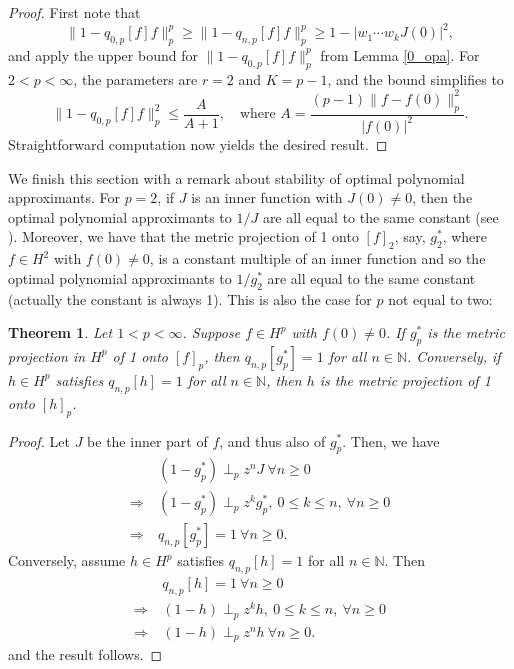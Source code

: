 \documentclass{article}
\theoremstyle{plain}
\newtheorem{Theorem}{Theorem}
\numberwithin{Theorem}{section}
\numberwithin{equation}{section}
\theoremstyle{plain}
\theoremstyle{definition}
\renewcommand{\leq}{\leqslant}
\renewcommand{\geq}{\geqslant}
\begin{document}
\begin{proof}
First note that 
\[
\|1 - q_{0,p}[f]f\|_p^p \geq \|1 - q_{n,p}[f]f\|_p^p \geq 1 - |w_1\cdots w_kJ(0)|^2,
\]
and apply the upper bound for $\|1 - q_{0,p}[f]f\|_p^p$ from Lemma \ref{0_opa}. For $2 < p < \infty$, the parameters are $r = 2$ and $K = p - 1$, and the bound simplifies to
\[
\|1 - q_{0,p}[f]f\|_p^{2} \leq \frac{A}{A + 1}, \quad \text{where } A = \frac{(p - 1)\|f - f(0)\|_p^2}{|f(0)|^2}.
\]
Straightforward computation now yields the desired result. 
\end{proof}
\iffalse
We finish this section with a remark about stability of optimal polynomial approximants. For $p=2$, if $J$ is an inner function with $J(0)\neq0$, then the optimal polynomial approximants to $1/J$ are all equal to the same constant (see \cite{BFKSS}). Moreover, we have that the metric projection of 1 onto $[f]_2$, say, $g_2^*$, where $f\in H^2$ with $f(0)\neq0$, is a constant multiple of an inner function and so the optimal polynomial approximants to $1/g_2^*$ are all equal to the same constant (actually the constant is always 1). This is also the case for $p$ not equal to two:
\begin{Theorem}
    Let $1<p<\infty$. Suppose $f\in H^p$ with $f(0)\neq0$. If $g_p^*$ is the metric projection in $H^p$ of 1 onto $[f]_p$, then $q_{n,p}[g_p^*] = 1$ for all $n\in\mathbb{N}$.  Conversely, if $h \in H^p$ satisfies $q_{n,p}[h] = 1$ for all $n\in\mathbb{N}$, then $h$ is the metric projection of 1 onto $[h]_p$.
\end{Theorem}
\begin{proof}  
Let $J$ be the inner part of $f$, and thus also of $g_p^*$. Then, we have
    \begin{align*}
        & (1-g_p^*) \perp_p z^n J  \ \forall n\geq 0\\
        \Longrightarrow\ & (1-g_p^*) \perp_p z^k g_p^*,\ 0\leq k \leq n,  \ \forall n\geq 0\\
        \Longrightarrow\ & q_{n,p}[g_p^*] = 1\ \forall n \geq 0.
    \end{align*}
    Conversely, assume $h\in H^p$ satisfies $q_{n,p}[h] = 1$ for all $n\in\mathbb{N}$. Then
    \begin{align*}
        & q_{n,p}[h] = 1\ \forall n \geq 0\\
        \Longrightarrow\ & (1-h) \perp_p z^k h,\ 0\leq k \leq n,  \ \forall n\geq 0\\
        \Longrightarrow\ & (1-h) \perp_p z^n h  \ \forall n\geq 0.
    \end{align*}
    and the result follows.
\end{proof}
\end{document}
